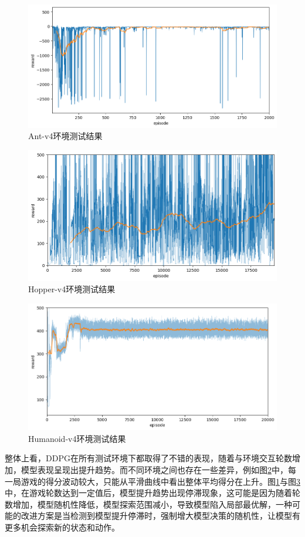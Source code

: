 \documentclass{article}
\begin{document}
\begin{figure}
	\centering
	\includegraphics[width=0.9\linewidth]{fig-ant.png}
	\caption{Ant-v4环境测试结果}
	\label{fig:ddpg-ant}
\end{figure}

\begin{figure}
	\centering
	\includegraphics[width=0.9\linewidth]{fig-hopper.png}
	\caption{Hopper-v4环境测试结果}
	\label{fig:ddpg-hopper}
\end{figure}

\begin{figure}
	\centering
	\includegraphics[width=0.9\linewidth]{fig-humanoid.png}
	\caption{Humanoid-v4环境测试结果}
	\label{fig:ddpg-humanoid}
\end{figure}

整体上看，DDPG在所有测试环境下都取得了不错的表现，随着与环境交互轮数增加，模型表现呈现出提升趋势。而不同环境之间也存在一些差异，例如图\ref{fig:ddpg-hopper}中，每一局游戏的得分波动较大，只能从平滑曲线中看出整体平均得分在上升。图\ref{fig:ddpg-ant}与图\ref{fig:ddpg-humanoid}中，在游戏轮数达到一定值后，模型提升趋势出现停滞现象，这可能是因为随着轮数增加，模型随机性降低，模型探索范围减小，导致模型陷入局部最优解，一种可能的改进方案是当检测到模型提升停滞时，强制增大模型决策的随机性，让模型有更多机会探索新的状态和动作。
\end{document}
